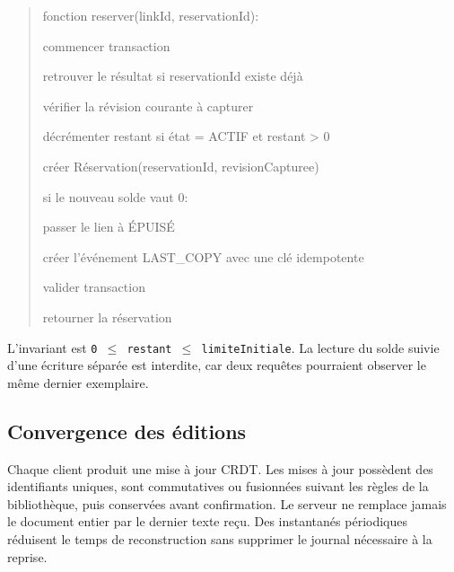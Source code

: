 \begin{quote}
\small\ttfamily\raggedright
fonction reserver(linkId, reservationId):\par
\hspace*{1em}commencer transaction\par
\hspace*{1em}retrouver le résultat si reservationId existe déjà\par
\hspace*{1em}vérifier la révision courante à capturer\par
\hspace*{1em}décrémenter restant si état = ACTIF et restant > 0\par
\hspace*{1em}créer Réservation(reservationId, revisionCapturee)\par
\hspace*{1em}si le nouveau solde vaut 0:\par
\hspace*{1em}\hspace*{1em}passer le lien à ÉPUISÉ\par
\hspace*{1em}\hspace*{1em}créer l'événement LAST\_COPY avec une clé idempotente\par
\hspace*{1em}valider transaction\par
\hspace*{1em}retourner la réservation
\end{quote}

L'invariant est \texttt{0 \ensuremath{\leq} restant \ensuremath{\leq} limiteInitiale}. La lecture du solde suivie d'une écriture séparée est interdite, car deux requêtes pourraient observer le même dernier exemplaire.


\subsection{Convergence des éditions}

Chaque client produit une mise à jour CRDT. Les mises à jour possèdent des identifiants uniques, sont commutatives ou fusionnées suivant les règles de la bibliothèque, puis conservées avant confirmation. Le serveur ne remplace jamais le document entier par le dernier texte reçu. Des instantanés périodiques réduisent le temps de reconstruction sans supprimer le journal nécessaire à la reprise.



